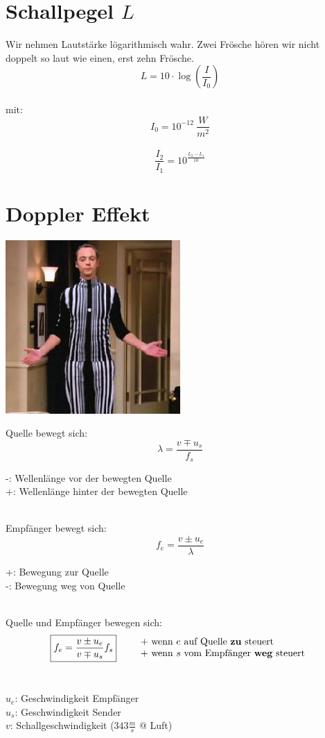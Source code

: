 \section{Schallpegel $L$}
Wir nehmen Lautstärke lögarithmisch wahr. Zwei Frösche hören wir nicht doppelt so laut wie einen, erst zehn Frösche.
\[\boxed{
	L = 10 \cdot \log \left( \frac{I}{I_0} \right)
}\]
\\
mit:
\[
	I_0 = 10^{-12}\ \frac{W}{m^2}
\]
\\
\[\boxed{
	\frac{I_2}{I_1} = 10^{\frac{L_2 - L_1}{10}}
}\]



\section{Doppler Effekt}
\begin{center}
	\includegraphics[scale=0.4]{dopplereffect.png}
\end{center}
Quelle bewegt sich:
\[
	\lambda = \frac{v\mp u_s}{f_s}
\]
\begin{footnotesize}
	-: Wellenlänge vor der bewegten Quelle\\
	+: Wellenlänge hinter der bewegten Quelle\\
\end{footnotesize}
\\
Empfänger bewegt sich:
\[
	f_e = \frac{v \pm u_e}{\lambda}
\]
\begin{footnotesize}
	+: Bewegung zur Quelle\\
	-: Bewegung weg von Quelle\\
\end{footnotesize}
\\
Quelle und Empfänger bewegen sich:
\[\boxed{
	f_e = \frac{v \pm u_e}{v \mp u_s}f_s
} \qquad
	\begin{array}{l}
	+ \text{ wenn $e$ auf Quelle \textbf{zu} steuert} \\ 
	+ \text{ wenn $s$ vom Empfänger \textbf{weg} steuert}
	\end{array} 
\]
\\
\begin{footnotesize}
	$u_e$: Geschwindigkeit Empfänger\\
	$u_s$: Geschwindigkeit Sender\\
	$v$: Schallgeschwindigkeit ($343\frac{m}{s}$ @ Luft)
\end{footnotesize}



